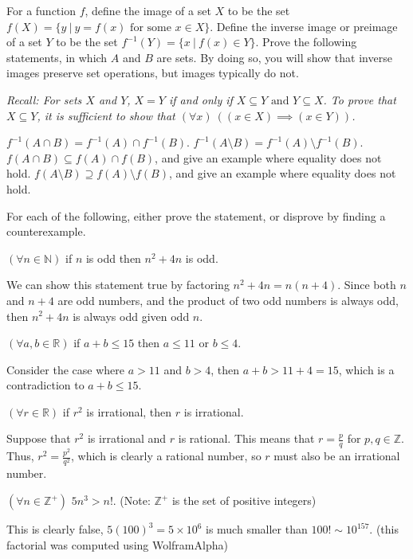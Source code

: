 \documentclass[11pt]{article}
\begin{document}

For a function $f$, define the image of a set $X$ to be the set $f(X) = \{y~|~y = f(x) \text{ for some } x \in X\}$. Define the inverse image or preimage of a set $Y$ to be the set $f^{-1}(Y) = \{x~|~f(x) \in Y\}$. Prove the following statements, in which $A$ and $B$ are sets. By doing so, you will show that inverse images preserve set operations, but images typically do not.

\textit{Recall: For sets $X$ and $Y$, $X=Y$ if and only if $X \subseteq Y \text{ and } Y \subseteq X$. To prove that $X \subseteq Y$, it is sufficient to show that $(\forall x)~((x \in X) \implies (x \in Y))$.}

\begin{Parts}
    \Part $f^{-1}(A \cap B) = f^{-1}(A) \cap f^{-1}(B)$.
    \Part $f^{-1}(A \setminus B) = f^{-1}(A) \setminus f^{-1}(B)$.
    \Part $f(A \cap B) \subseteq f(A) \cap f(B)$, and give an example where equality does not hold.
    \Part $f(A \setminus B) \supseteq f(A) \setminus f(B)$, and give an example where equality does not hold.
\end{Parts}

For each of the following, either prove the statement, or disprove by finding a counterexample.
\begin{Parts}
	\Part $(\forall n \in \mathbb{N})$ if $n$ is odd then $n^2 + 4n$ is odd.

    \begin{solution}
        We can show this statement true by factoring $n^2 + 4n = n(n+4)$. Since both $n$ and $n + 4$ are odd numbers, and the product of two odd numbers is always odd, then $n^2 + 4n$ is always odd given odd $n$.
    \end{solution}

	\Part $(\forall a, b \in \mathbb{R})$ if $a + b \le 15$ then $a \le 11$ or $b \le 4$.

    \begin{solution}
        Consider the case where $a > 11$ and $b > 4$, then $a + b > 11 + 4 = 15$, which is a contradiction to $a + b \le 15$.
    \end{solution}
	\Part $(\forall r \in \mathbb{R})$ if $r^2$ is irrational, then $r$ is irrational.
\begin{solution}
    Suppose that $r^2$ is irrational and $r$ is rational. This means that $r =\frac{p}{q}$ for $p, q \in \mathbb Z$. Thus, $r^2 = \frac{p^2}{q^2}$, which is clearly a rational number, so $r$ must also be an irrational number.
\end{solution} 
	\Part $(\forall n \in \mathbb{Z}^+)$ $5n^3 > n!$. (Note: $\mathbb{Z}^+$ is the set of positive integers)
    \begin{solution}
    This is clearly false, $5(100)^3 = 5 \times 10^6$ is much smaller than $100! \sim 10^{157}$. (this factorial was computed using WolframAlpha)
    \end{solution}
\end{Parts}
\end{document}
